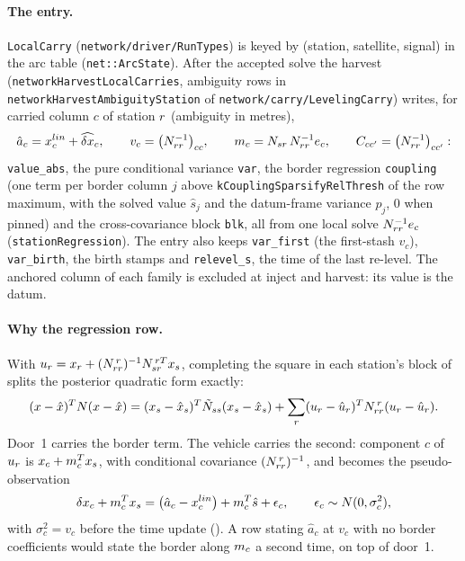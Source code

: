 \documentclass[main.tex]{subfiles}
\begin{document}
\paragraph{The entry.}
\texttt{LocalCarry} (\texttt{network/driver/RunTypes}) is keyed by
(station, satellite, signal) in the arc table (\texttt{net::ArcState}).
After the accepted solve the harvest
(\texttt{networkHarvestLocalCarries}, ambiguity rows in
\texttt{networkHarvestAmbiguityStation} of
\texttt{network/carry/LevelingCarry}) writes, for carried column $c$ of
station $r$ (ambiguity in metres),
\begin{equation}
\hat a_c = x^{lin}_{c} + \widehat{\delta x}_c,
\qquad
v_c = \big(N_{rr}^{-1}\big)_{cc},
\qquad
m_{c} = N_{sr}\,N_{rr}^{-1}e_c,
\qquad
C_{cc'} = \big(N_{rr}^{-1}\big)_{cc'} :
\label{eq:veh-harvest}
\end{equation}
\texttt{value\_abs}, the pure conditional variance \texttt{var}, the border
regression \texttt{coupling} (one term per border column $j$ above
\texttt{kCouplingSparsifyRelThresh} of the row maximum, with the solved
value $\hat s_j$ and the datum-frame variance $p_j$, $0$ when pinned) and
the cross-covariance block \texttt{blk}, all from one local solve
$N_{rr}^{-1}e_c$ (\texttt{stationRegression}). The entry also keeps
\texttt{var\_first} (the first-stash $v_c$), \texttt{var\_birth}, the
birth stamps and \texttt{relevel\_s}, the time of the last re-level. The
anchored column of each family is excluded at inject and harvest: its
value is the datum.

\paragraph{Why the regression row.}
With $u_r = x_{r} + (N_{rr}^{\,r})^{-1}N_{sr}^{\,rT}x_s$,
completing the square in each station's block of
 splits the posterior
quadratic form exactly:
\begin{equation}
(x-\hat{x})^{T}N(x-\hat{x})
 = (x_s-\hat{x}_s)^{T}\tilde{N}_{ss}(x_s-\hat{x}_s)
 + \sum_{r}(u_r-\hat{u}_r)^{T}N_{rr}^{\,r}(u_r-\hat{u}_r).
\label{eq:veh-split}
\end{equation}
Door~1 carries the border term. The vehicle carries the second: component
$c$ of $u_r$ is $x_c + m_{c}^{T}x_s$, with conditional
covariance $(N_{rr}^{\,r})^{-1}$, and becomes the pseudo-observation
\begin{equation}
\delta x_c + m_{c}^{T}x_s
 = \big(\hat a_c - x^{lin}_{c}\big) + m_{c}^{T}\hat{s} + \epsilon_c ,
\qquad \epsilon_c \sim N(0,\sigma_c^2),
\label{eq:veh-row}
\end{equation}
with $\sigma_c^2 = v_c$ before the time update
(). A row stating $\hat a_c$ at $v_c$ with no
border coefficients would state the border along $m_{c}$ a second time,
on top of door~1.
\end{document}
